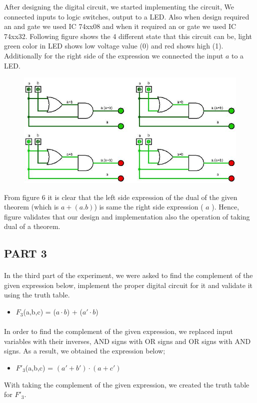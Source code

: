 \documentclass[pdftex,12pt,a4paper]{article}
\begin{document}
After designing the digital circuit, we started implementing the circuit, We connected inputs to logic switches, output to a LED. Also when design required an and gate we used IC 74xx08 and when it required an or gate we used IC 74xx32. Following figure shows the 4 different state that this circuit can be, light green color in LED shows low voltage value (0) and red shows high (1). Additionally for the right side of the expression we connected the input $a$ to a LED.  

\begin{figure}[H]
	\centering
	\includegraphics[width=1\textwidth]{E2P2.1.2.jpg}
	\caption{}
	\label{Figure 6}
\end{figure}
From figure 6 it is clear that the left side expression of the dual of the given theorem (which is $a + (a.b)$) is same the right side expression ( $a$ ). Hence, figure validates that our design and implementation also the operation of taking dual of a theorem.
\clearpage
\subsection{PART 3}
\paragraph{}
In the third part of the experiment, we were asked to find the complement of the given expression below, implement the proper digital circuit for it and validate it using the truth table.
\begin{itemize}
    \item $F_{3}$(a,b,c) = ($a \cdot b$) + ($a' \cdot b$)
\end{itemize}
\paragraph{}
In order to find the complement of the given expression, we replaced input variables with their inverses, AND signs with OR signs and OR signs with AND signs. As a result, we obtained the expression below;
\begin{itemize}
    \item $F'_{3}$(a,b,c) = $(a'+b') \cdot (a+c')$
\end{itemize}
With taking the complement of the given expression, we created the truth table for $F'_{3}$.
\end{document}
